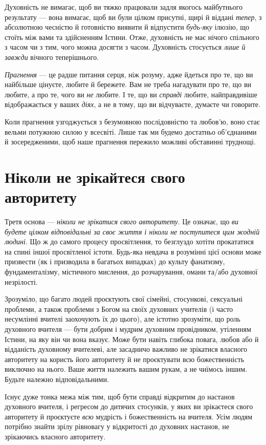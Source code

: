 Духовність не вимагає, щоб ви тяжко працювали задля якогось майбутнього результату — вона вимагає, щоб ви були цілком присутні, щирі й віддані \emph{тепер}, з абсолютною чесністю й готовністю виявити й відпустити \emph{будь-яку} ілюзію, що стоїть між вами та здійсненням Істини. Отже, духовність не має нічого спільного з часом чи з тим, чого можна досягти з часом. Духовність стосується \emph{лише й завжди} вічного теперішнього.

\emph{Прагнення} — це радше питання серця, ніж розуму, адже йдеться про те, що ви найбільше цінуєте, любите й бережете. Вам не треба нагадувати про те, що ви любите, а про те, чого ви \emph{не} любите. І те, що ви \emph{справді} любите, найправдивіше відображається у ваших \emph{діях}, а не в тому, що ви відчуваєте, думаєте чи говорите.

Коли прагнення узгоджується з безумовною послідовністю та любов'ю, воно стає вельми потужною силою у всесвіті. Лише так ми будемо достатньо об'єднаними й зосередженими, щоб наше прагнення пережило можливі обставинні труднощі.

\section*{Ніколи не зрікайтеся свого авторитету}

Третя основа — \emph{ніколи не зрікатися свого авторитету}. Це означає, що \emph{ви будете цілком відповідальні за своє життя і ніколи не поступитеся цим жодній людині}. Що ж до самого процесу просвітлення, то безглуздо хотіти прокататися на спині іншої просвітленої істоти. Будь-яка невдача в розумінні цієї основи може призвести (як і призводила в багатьох випадках) до культу фанатизму, фундаменталізму, містичного мислення, до розчарування, омани та/або духовної незрілості.

Зрозуміло, що багато людей проєктують свої сімейні, стосункові, сексуальні проблеми, а також проблеми з Богом на своїх духовних учителів (і часто несумлінні вчителі заохочують їх до цього), але істотно зрозуміти, що роль духовного вчителя — бути добрим і мудрим духовним провідником, утіленням Істини, на яку він чи вона вказує. Може бути навіть глибока повага, любов або й відданість духовному вчителеві, але засадничо важливо не зрікатися власного авторитету на користь його авторитету й не проєктувати всю божественність виключно на нього. Ваше життя належить вашим рукам, а не чиїмось іншим. Будьте належно відповідальними.

Існує дуже тонка межа між тим, щоб бути справді відкритим до настанов духовного вчителя, і регресом до дитячих стосунків, у яких ви зрікаєтеся свого авторитету й проєктуєте \emph{всю} мудрість і божественність на вчителя. Усім людям потрібно знайти зрілу рівновагу у відкритості до духовних настанов, не зрікаючись власного авторитету.

